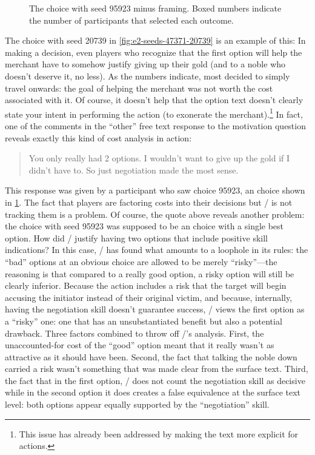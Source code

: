 \begin{figure}[!b]
\caption[``Obvious failure'' choice 95923]{The \obvf{} choice with seed 95923 minus framing. Boxed numbers indicate the number of participants that selected each outcome.}
\label{fig:e2-seed-95923}
\end{figure}


The choice with seed 20739 in \cref{fig:e2-seeds-47371-20739} is an example of this: In making a decision, even players who recognize that the first option will help the merchant have to somehow justify giving up their gold (and to a noble who doesn't deserve it, no less).
%
As the numbers indicate, most decided to simply travel onwards: the goal of helping the merchant was not worth the cost associated with it.
%
Of course, it doesn't help that the option text doesn't clearly state your intent in performing the action (to exonerate the merchant).\footnote{This issue has already been addressed by making the text more explicit for  actions.}
%
In fact, one of the comments in the ``other'' free text response to the motivation question reveals exactly this kind of cost analysis in action:

\begin{quote}
  \quoteshape
You only really had 2 options. I wouldn't want to give up the gold if I didn't have to. So just negotiation made the most sense.
\end{quote}

This response was given by a participant who saw choice 95923, an \obvf{} choice shown in \cref{fig:e2-seed-95923}.
%
The fact that players are factoring costs into their decisions but \dunyazad/ is not tracking them is a problem.
%
Of course, the quote above reveals another problem: the choice with seed 95923 was supposed to be an  choice with a single best option.
%
How did \dunyazad/ justify having two options that include positive skill indications?
%
In this case, \dunyazad/ has found what amounts to a loophole in its rules: the ``bad'' options at an obvious choice are allowed to be merely ``risky''---the reasoning is that compared to a really good option, a risky option will still be clearly inferior.
%
Because the  action includes a risk that the target will begin accusing the initiator instead of their original victim, and because, internally, having the negotiation skill doesn't guarantee success, \dunyazad/ views the first option as a ``risky'' one: one that has an unsubstantiated benefit but also a potential drawback.
%
Three factors combined to throw off \dunyazad/'s analysis.
%
First, the unaccounted-for cost of the ``good'' option meant that it really wasn't as attractive as it should have been.
%
Second, the fact that talking the noble down carried a risk wasn't something that was made clear from the surface text.
%
Third, the fact that in the first option, \dunyazad/ does not count the negotiation skill as decisive while in the second option it does creates a false equivalence at the surface text level: both options appear equally supported by the ``negotiation'' skill.


